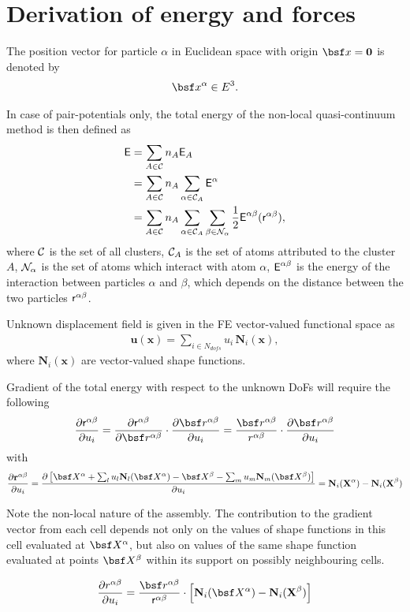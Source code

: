 \documentclass[a4paper,10pt]{article}
\def\gz  #1{           \mbox{$\mathbf{#1}$}}
\def\msf  #1{           \mbox{\!\!      $\sf #1$}}
\def\mcl  #1{               {\cal #1}}
\begin{document}
\section{Derivation of energy and forces}
The position vector for particle $\alpha$ in Euclidean space with origin $\bsf x = \gz 0$ is denoted by
\begin{align}
\bsf x^\alpha \in  E^3.
\end{align}

In case of pair-potentials only, the total energy of the non-local quasi-continuum method is then defined as
\begin{align}
\msf E &= \sum_{A \in \mcl C} n_A \msf E_A \\
           &= \sum_{A \in \mcl C} n_A \sum_{\alpha \in \mcl C_A} \msf E^\alpha \\
           &= \sum_{A \in \mcl C} n_A \sum_{\alpha \in \mcl C_A} \sum_{\beta \in \mcl N_\alpha} \frac{1}{2} \msf E^{\alpha \beta} (\msf r^{\alpha\beta}),
\end{align}
where $\mcl C$ is the set of all clusters, $\mcl C_A$ is the set of atoms attributed to the cluster $A$, $\mcl N_\alpha$ is the set of atoms which interact with atom $\alpha$,
$\msf E^{\alpha \beta}$ is the energy of the interaction between particles $\alpha$ and $\beta$, which depends on the distance between the two particles $\msf r^{\alpha\beta}$.

Unknown displacement field is given in the FE vector-valued functional space as
\begin{align}
\gz u (\gz x) = \sum_{i \in N_{dofs}} u_i \, \gz N_i (\gz x),
\end{align}
where $\gz N_i (\gz x)$ are vector-valued shape functions.

Gradient of the total energy with respect to the unknown DoFs will require the following
\begin{align}
\frac{\partial \msf r^{\alpha \beta}}{\partial u_i} = \frac{\partial \msf r^{\alpha \beta}}{\partial \bsf r^{\alpha\beta}} \cdot \frac{\partial \bsf r^{\alpha\beta}}{\partial u_i} = \frac{\bsf r^{\alpha\beta}}{r^{\alpha\beta}} \cdot \frac{\partial \bsf r^{\alpha\beta}}{\partial u_i}
\end{align}
with
\begin{align}
\frac{\partial \gz r^{\alpha\beta}}{\partial u_i} = \frac{\partial\left[\bsf X^\alpha + \sum_l u_l \gz N_l(\bsf X^\alpha) - \bsf X^\beta - \sum_m u_m \gz N_m(\bsf X^\beta)\right]}{\partial u_i} = \gz N_i (\gz X^\alpha) - \gz N_i (\gz X^\beta)
\end{align}

Note the non-local nature of the assembly. The contribution to the gradient vector from each cell depends not only on the values of shape functions in this cell evaluated at $\bsf X^\alpha$, but also on values of the same shape function evaluated at points $\bsf X^\beta$ within its support on possibly neighbouring cells.

\begin{align}
\frac{\partial r^{\alpha\beta}}{\partial u_i} = \frac{\bsf r^{\alpha\beta}}{\msf r^{\alpha\beta}} \cdot \left[\gz N_i (\bsf X^\alpha) - \gz N_i (\gz X^\beta) \right]
\end{align}
\end{document}

